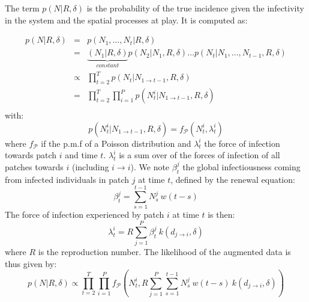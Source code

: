 \documentclass[a4paper,11pt]{article}
\begin{document}
The term $p(N | R, \delta)$ is the probability of the true incidence 
given the infectivity in the system and the spatial processes at play.
It is computed as:

\begin{eqnarray}
p(N | R, \delta) & = & p(N_1, \ldots, N_t | R, \delta)\\
 & = & \underbrace{(N_1| R, \delta)}_{constant} p(N_2| N_1, R, \delta) \ldots 
       p(N_t| N_1, \ldots, N_{t-1}, R, \delta) \\
 & \propto & \prod_{t=2}^T p(N_t| N_{1 \rightarrow t-1}, R, \delta)\\
 & = & \prod_{t=2}^T \prod_{i=1}^P 
       p(N_t^i| N_{1 \rightarrow t-1}, R, \delta)\\
\end{eqnarray}
with:
\begin{equation}
p(N_t^i| N_{1 \rightarrow t-1}, R, \delta) = f_\mathcal{P}(N_t^i, \lambda_t^i)
\end{equation}
where $f_\mathcal{P}$ if the p.m.f of a Poisson distribution and $\lambda_t^i$ 
the force of infection towards patch $i$ and time $t$.
$\lambda_t^i$ is a sum over of the forces of infection of all patches towards $i$ (including $i \rightarrow i$). 
We note $\beta_t^j$ the global infectiousness coming from infected individuals 
in patch $j$ at time $t$, defined by the renewal equation:
\begin{equation}
 \beta_t^j = \sum_{s=1}^{t-1} N_s^j \:  w(t - s)
\end{equation}
The force of infection experienced by patch $i$ at time $t$ is then:
\begin{equation}
\lambda_t^i = R \sum_{j=1}^P \beta_t^j \: k(d_{j\rightarrow i},\delta)
\end{equation}
where $R$ is the reproduction number. 
The likelihood of the augmented data is thus given by:
\begin{equation}
p(N|R, \delta) \propto \prod_{t=2}^T \prod_{i=1}^P 
       f_\mathcal{P}(N_t^i, R 
       \sum_{j=1}^P \sum_{s=1}^{t-1} N_s^j \:  w(t - s) \:
       k(d_{j\rightarrow i},\delta) )
\end{equation}
\end{document}
